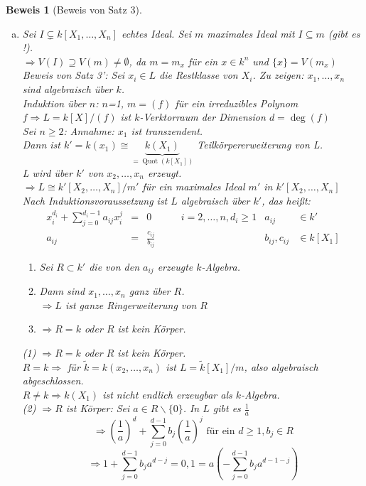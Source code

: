 \documentclass[a4paper,12pt]{report}
\theoremstyle{break}
\theoremstyle{nonumberbreak}
\newtheorem{Bew}{Beweis}
\theoremstyle{nonumberplain}
\DeclareMathOperator{\Quot}{Quot}
\begin{document}
\begin{Bew}[Beweis von Satz 3]\begin{enumerate}[a)]
\item
Sei $I\subsetneq k[X_1,\dots ,X_n]$ echtes Ideal. Sei $m$ maximales Ideal mit $I\subseteq m$ (gibt es !).\\
$\Rightarrow V(I) \supseteq V(m) \neq \emptyset$, da $m=m_x$ f\"ur ein $x\in k^n$ und $\{x\}=V(m_x)$\\
\emph{Beweis von Satz 3':} Sei $x_i\in L$ die Restklasse von $X_i$. \emph{Zu zeigen:} $x_1,\dots ,x_n$ sind algebraisch \"uber $k$.\\
\emph{Induktion \"uber $n$:} $n$=1, $m=(f)$ f\"ur ein irreduzibles Polynom $f \Rightarrow L=k[X]/(f)$ ist $k$-Verktorraum der Dimension $d= \deg(f)$\\
Sei $n\geq 2$: \emph{Annahme:} $x_1$ ist transzendent.\\
Dann ist $k'=k(x_1) \cong \underbrace{k(X_1)}_{=\Quot{(k[X_1])}}$ Teilk\"orpererweiterung von L.\\
L wird \"uber $k'$ von $x_2,\dots ,x_n$ erzeugt.\\
$\Rightarrow L \cong k'[X_2,\dots ,X_n]/m'$ f\"ur ein maximales Ideal $m'$ in $k'[X_2,\dots ,X_n]$\\
Nach Induktionsvoraussetzung ist $L$ algebraisch \"uber $k'$, das hei\ss t:
	\[\begin{array}{rclccrl}
	x_i^{d_i} + \sum_{j=0}^{d_i-1} a_{ij}x_i^j &=& 0 & \quad & i=2,\dots ,n, d_i \geq1 & a_{ij} &\in k'\\
	a_{ij} &=& \frac{c_{ij}}{b_{ij}} & \quad & & b_{ij}, c_{ij} &\in k[X_1]
	\end{array}\]
\begin{enumerate}[(1)]
\item Sei $R\subset k'$ die von den $a_{ij}$ erzeugte $k$-Algebra.
\item Dann sind $x_1,\dots ,x_n$ ganz \"uber $R$.\\
	$\Rightarrow L$ ist ganze Ringerweiterung von $R$
\item $\Rightarrow R=k$ oder $R$ ist kein K\"orper.
\end{enumerate}
(1) $\Rightarrow R=k$ oder $R$ ist kein K\"orper.\\
$R=k \Rightarrow $ f\"ur $\tilde k=k(x_2,\dots ,x_n)$ ist $L= \tilde k[X_1]/m$, also algebraisch abgeschlossen.\\
$R\neq k \Rightarrow k(X_1)$ ist nicht endlich erzeugbar als $k$-Algebra.\\
(2) $\Rightarrow R$ ist K\"orper: Sei $a\in R\backslash\{0\}$. In $L$ gibt es $\frac{1}{a}$
	\[\Rightarrow \left(\frac{1}{a}\right)^d+\sum_{j=0}^{d-1} b_j\left(\frac{1}{a} \right)^j\textrm{ f\"ur ein } d\geq1, b_j\in R\]
	\[\Rightarrow 1+\sum_{j=0}^{d-1} b_ja^{d-j} = 0, 1 = a\left( -\sum_{j=0}^{d-1}b_ja^{d-1-j} \right)\]


\end{enumerate}
\end{Bew}
\end{document}
